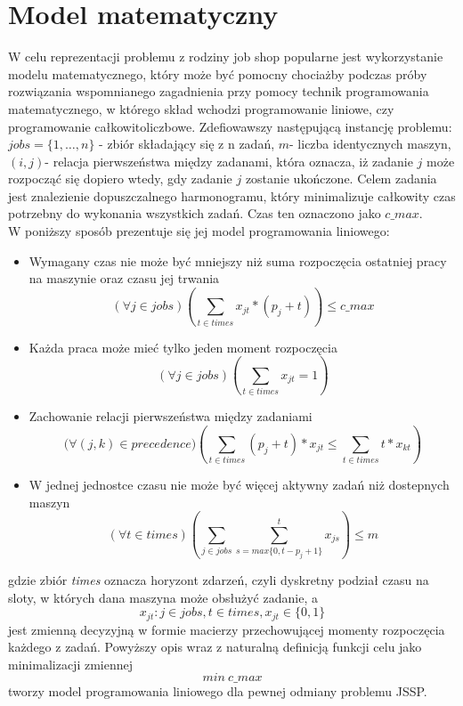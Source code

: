 \documentclass[12pt, a4paper]{report}
\begin{document}
  \section{Model matematyczny}
  W celu reprezentacji problemu z rodziny job shop popularne jest wykorzystanie modelu 
  matematycznego, który może być pomocny chociażby podczas próby rozwiązania wspomnianego 
  zagadnienia przy pomocy technik programowania matematycznego, w którego skład wchodzi programowanie liniowe,
  czy programowanie całkowitoliczbowe.
  Zdefiowawszy następującą instancję problemu: \\
  $jobs = \{1, \dots, n\} $ - zbiór składający się z n zadań, $m$- liczba identycznych maszyn, $(i,j)$-
  relacja pierwszeństwa między zadanami, która oznacza, iż zadanie $j$ może rozpocząć się dopiero wtedy, gdy 
  zadanie $j$ zostanie ukończone.  Celem zadania jest znalezienie dopuszczalnego harmonogramu, który
  minimalizuje całkowity czas potrzebny do wykonania wszystkich zadań. Czas
  ten oznaczono jako $c\_max$.\\
  W poniższy sposób prezentuje się jej model programowania liniowego:
  \begin{itemize}
      \item Wymagany czas nie może być mniejszy niż suma rozpoczęcia ostatniej pracy na maszynie oraz czasu jej trwania
      \begin{equation}
          (\forall {j \in jobs}) (\sum_{t \in times} x_{jt} * (p_{j}+t)) \leq c\_max
      \end{equation}
      \item Każda praca może mieć tylko jeden moment rozpoczęcia 
      \begin{equation}
          (\forall {j \in jobs}) (\sum_{t \in times} x_{jt} = 1 )
      \end{equation}
      \item Zachowanie relacji pierwszeństwa między zadaniami
      \begin{equation}
          (\forall {(j,k) \in precedence)}(\sum_{t \in times} (p_{j} + t)*x_{jt} \leq \sum_{t \in times} t*x_{kt}) 
      \end{equation}
      \item W jednej jednostce czasu nie może być więcej aktywny zadań niż dostepnych maszyn
      \begin{equation}
          (\forall {t \in times}) (\sum_{j \in jobs} \sum_{s = max\{0,t-p_{j}+1 \}}^ {t} x_{js} ) \leq m
      \end{equation}
  \end{itemize}
  gdzie zbiór \textit{times} oznacza horyzont zdarzeń, czyli dyskretny podział czasu na sloty, w których dana maszyna może obsłużyć zadanie, a 
  \begin{equation}
    x_{jt} : j \in jobs, t \in times, x_{jt} \in \{0,1\}
  \end{equation}
  jest zmienną decyzyjną w formie macierzy przechowującej momenty rozpoczęcia każdego z zadań.
  Powyższy opis wraz z naturalną definicją funkcji celu jako minimalizacji zmiennej 
  \begin{equation}
    min \: c\_max
  \end{equation}
  tworzy model programowania liniowego dla pewnej odmiany problemu JSSP.
\end{document}
